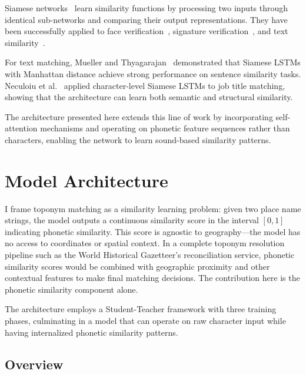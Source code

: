 \documentclass[11pt]{article}
\begin{document}
    Siamese networks~\citep{bromley1993,chopra2005} learn similarity functions by processing two inputs through identical sub-networks and comparing their output representations. They have been successfully applied to face verification~\citep{schroff2015}, signature verification~\citep{bromley1993}, and text similarity~\citep{mueller2016,neculoiu2016}.

    For text matching, Mueller and Thyagarajan~\citep{mueller2016} demonstrated that Siamese LSTMs with Manhattan distance achieve strong performance on sentence similarity tasks. Neculoiu et al.~\citep{neculoiu2016} applied character-level Siamese LSTMs to job title matching, showing that the architecture can learn both semantic and structural similarity.

    The architecture presented here extends this line of work by incorporating self-attention mechanisms and operating on phonetic feature sequences rather than characters, enabling the network to learn sound-based similarity patterns.



    \section{Model Architecture}
    \label{sec:architecture}

    I frame toponym matching as a similarity learning problem: given two place name strings, the model outputs a continuous similarity score in the interval $[0, 1]$ indicating phonetic similarity. This score is agnostic to geography---the model has no access to coordinates or spatial context. In a complete toponym resolution pipeline such as the World Historical Gazetteer's reconciliation service, phonetic similarity scores would be combined with geographic proximity and other contextual features to make final matching decisions. The contribution here is the phonetic similarity component alone.

    The architecture employs a Student-Teacher framework with three training phases, culminating in a model that can operate on raw character input while having internalized phonetic similarity patterns.

    \subsection{Overview}
\end{document}
